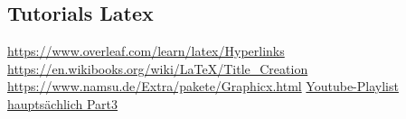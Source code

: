 \documentclass {article}[a4paper,12pt]
\begin{document}
\subsection{Tutorials Latex}
\url{https://www.overleaf.com/learn/latex/Hyperlinks}
\newline
\url{https://en.wikibooks.org/wiki/LaTeX/Title_Creation}
\newline
\url{https://www.namsu.de/Extra/pakete/Graphicx.html}
\newline
\href{https://www.youtube.com/watch?v=R6etJS4XXPM&list=PL0FqMC_xCtjTg5XgHXhNPUJNib6gW_Zpi&index=3&ab_channel=ThomasErben-TutorialsundLehrvideos}
{Youtube-Playlist hauptsächlich Part3}
\end{document}
